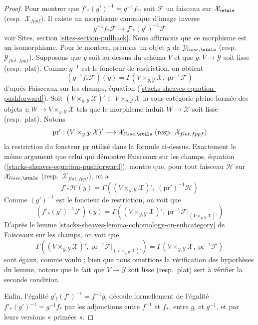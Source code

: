 \begin{proof}
\medskip\noindent
Pour montrer que $f'_*(g')^{-1} = g^{-1}f_*$, soit $\mathcal{F}$ un faisceau
sur $\mathcal{X}_\etale$ (resp.\ $\mathcal{X}_{fppf}$).
Il existe un morphisme canonique d'image inverse
$$
g^{-1}f_*\mathcal{F} \longrightarrow f'_*(g')^{-1}\mathcal{F}
$$
voir Sites, section \ref{sites-section-pullback}.
Nous affirmons que ce morphisme est un isomorphisme.
Pour le montrer, prenons un objet $y$ de $\mathcal{Y}_{lisse,\etale}$
(resp.\ $\mathcal{Y}_{flat,fppf}$). Supposons que $y$ soit au-dessus du schéma
$V$ et que $y : V \to \mathcal{Y}$ soit lisse (resp.\ plat). Comme
$g^{-1}$ est le foncteur de restriction, on obtient
$$
\left(g^{-1}f_*\mathcal{F}\right)(y) =
\Gamma(V \times_{y, \mathcal{Y}} \mathcal{X},\ \text{pr}^{-1}\mathcal{F})
$$
d'après Faisceaux sur les champs, équation
(\ref{stacks-sheaves-equation-pushforward}). Soit
$(V \times_{y, \mathcal{Y}} \mathcal{X})' \subset
V \times_{y, \mathcal{Y}} \mathcal{X}$
la sous-catégorie pleine formée des objets
$z : W \to V \times_{y, \mathcal{Y}} \mathcal{X}$ tels que le morphisme
induit $W \to \mathcal{X}$ soit lisse (resp.\ plat). Notons
$$
\text{pr}' :
(V \times_{y, \mathcal{Y}} \mathcal{X})'
\longrightarrow
\mathcal{X}_{lisse,\etale}
\ (\text{resp. }\mathcal{X}_{flat,fppf})
$$
la restriction du foncteur $\text{pr}$ utilisé dans la formule ci-dessus.
Exactement le même argument que celui qui démontre
Faisceaux sur les champs, équation (\ref{stacks-sheaves-equation-pushforward}),
montre que, pour tout faisceau $\mathcal{H}$ sur $\mathcal{X}_{lisse,\etale}$
(resp.\ $\mathcal{X}_{flat,fppf}$), on a
\begin{equation}
\label{equation-pushforward-lisse-etale}
f'_*\mathcal{H}(y) =
\Gamma((V \times_{y, \mathcal{Y}} \mathcal{X})',
\ (\text{pr}')^{-1}\mathcal{H})
\end{equation}
Comme $(g')^{-1}$ est le foncteur de restriction, on voit que
$$
\left(f'_*(g')^{-1}\mathcal{F}\right)(y) =
\Gamma((V \times_{y, \mathcal{Y}} \mathcal{X})',
\ \text{pr}^{-1}\mathcal{F}|_{(V \times_{y, \mathcal{Y}} \mathcal{X})'})
$$
D'après le
lemme \ref{stacks-sheaves-lemma-cohomology-on-subcategory} de Faisceaux sur les champs,
on voit que
$$
\Gamma((V \times_{y, \mathcal{Y}} \mathcal{X})',
\ \text{pr}^{-1}\mathcal{F}|_{(V \times_{y, \mathcal{Y}} \mathcal{X})'})
=
\Gamma(V \times_{y, \mathcal{Y}} \mathcal{X},\ \text{pr}^{-1}\mathcal{F})
$$
sont égaux, comme voulu ; bien que nous omettions la vérification des hypothèses
du lemme, notons que le fait que $V \to \mathcal{Y}$ soit lisse
(resp.\ plat) sert à vérifier la seconde condition.

\medskip\noindent
Enfin, l'égalité $g'_!(f')^{-1} = f^{-1}g_!$ découle formellement de
l'égalité $f'_*(g')^{-1} = g^{-1}f_*$ par les adjonctions entre
$f^{-1}$ et $f_*$, entre $g_!$ et $g^{-1}$, et par leurs versions
« primées ».
\end{proof}

